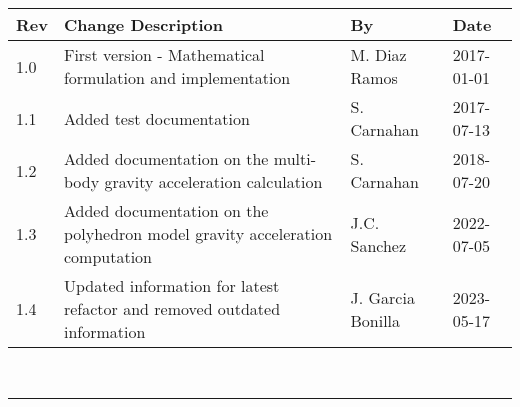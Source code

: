 \documentclass[]{BasiliskReportMemo}
\begin{document}
\makeCover

%
%
\pagestyle{empty}
\clearpage
{\renewcommand{\arraystretch}{2}
	\noindent
	\begin{longtable}{|p{0.5in}|p{3.5in}|p{1.07in}|p{0.9in}|}
		\hline
		{\bfseries Rev} & {\bfseries Change Description} & {\bfseries By}& {\bfseries Date} \\
		\hline
		1.0 & First version - Mathematical formulation and implementation & M. Diaz Ramos & 2017-01-01\\
		\hline
		1.1 & Added test documentation & S. Carnahan &2017-07-13\\
		\hline
		1.2 & Added documentation on the multi-body gravity acceleration calculation & S. Carnahan &2018-07-20\\
		\hline
		1.3 & Added documentation on the polyhedron model gravity acceleration computation & J.C. Sanchez &2022-07-05\\
		\hline
		1.4 & Updated information for latest refactor and removed outdated information & J. Garcia Bonilla &2023-05-17\\
		\hline
	\end{longtable}
}

\setcounter{page}{1}
\pagestyle{fancy}

\tableofcontents %
~\\ \hrule ~\\ %
	









\end{document}
